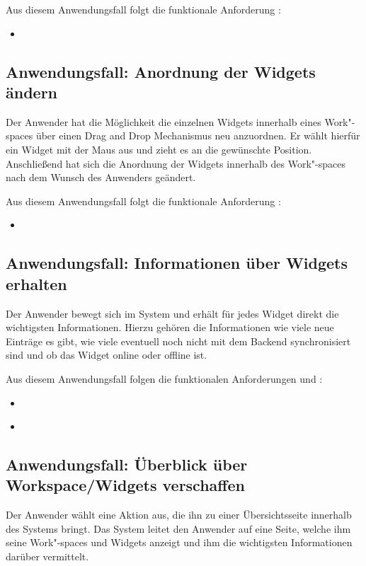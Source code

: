 Aus diesem Anwendungsfall folgt die funktionale Anforderung :
\begin{itemize}
 \item \requirementf{\requirementWidgetDelete}\label{requirementWidgetDelete}
\end{itemize}
 
\subsection{Anwendungsfall: Anordnung der Widgets ändern}
Der Anwender hat die Möglichkeit die einzelnen Widgets innerhalb eines Work"-spaces über einen Drag and Drop Mechanismus neu anzuordnen. Er wählt hierfür ein Widget mit der Maus aus und zieht es an die gewünschte Position. Anschließend hat sich die Anordnung der Widgets innerhalb des Work"-spaces nach dem Wunsch des Anwenders geändert.
 
Aus diesem Anwendungsfall folgt die funktionale Anforderung :
\begin{itemize}
 \item \requirementf{\requirementWidgetSortDragNDrop}\label{requirementWidgetSortDragNDrop}
\end{itemize}

\subsection{Anwendungsfall: Informationen über Widgets erhalten}
Der Anwender bewegt sich im System und erhält für jedes Widget direkt die wichtigsten Informationen. Hierzu gehören die Informationen wie viele neue Einträge es gibt, wie viele eventuell noch nicht mit dem Backend synchronisiert sind und ob das Widget online oder offline ist.
 
Aus diesem Anwendungsfall folgen die funktionalen Anforderungen  und :
\begin{itemize}
 \item \requirementf{\requirementWidgetInformSystem}\label{requirementWidgetInformSystem}
 \item \requirementf{\requirementWidgetInformUser}\label{requirementWidgetInformUser}
\end{itemize}

\subsection{Anwendungsfall: Überblick über Workspace/Widgets verschaffen}
Der Anwender wählt eine Aktion aus, die ihn zu einer Übersichtsseite innerhalb des Systems bringt. Das System leitet den Anwender auf eine Seite, welche ihm seine Work"-spaces und Widgets anzeigt und ihm die wichtigsten Informationen darüber vermittelt.

